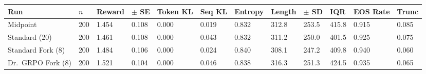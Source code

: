\begin{adjustbox}{max width=\linewidth}
\begin{tabular}{llllllllllll}
\toprule
Run & $n$ & Reward & $\pm$ SE & Token KL & Seq KL & Entropy & Length & $\pm$ SD & IQR & EOS Rate & Trunc \\
\midrule
Midpoint & 200 & 1.454 & 0.108 & 0.000 & 0.019 & 0.832 & 312.8 & 253.5 & 415.8 & 0.915 & 0.085 \\
Standard (20) & 200 & 1.461 & 0.108 & 0.000 & 0.043 & 0.832 & 311.2 & 250.0 & 401.5 & 0.925 & 0.075 \\
Standard Fork (8) & 200 & 1.484 & 0.106 & 0.000 & 0.024 & 0.840 & 308.1 & 247.2 & 409.8 & 0.940 & 0.060 \\
Dr.~GRPO Fork (8) & 200 & 1.521 & 0.104 & 0.000 & 0.046 & 0.838 & 316.3 & 251.3 & 424.5 & 0.935 & 0.065 \\
\bottomrule
\end{tabular}
\end{adjustbox}
